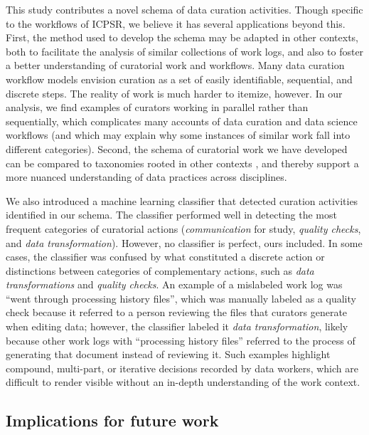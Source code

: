 \documentclass[conference]{IEEEtran}
\begin{document}
This study contributes a novel schema of data curation activities. Though specific to the workflows of ICPSR, we believe it has several applications beyond this. First, the method used to develop the schema may be adapted in other contexts, both to facilitate the analysis of similar collections of work logs, and also to foster a better understanding of curatorial work and workflows. Many data curation workflow models \cite{Higgins2008-ki, DDI-Lifecycle} envision curation as a set of easily identifiable, sequential, and discrete steps. The reality of work is much harder to itemize, however. In our analysis, we find examples of curators working in parallel rather than sequentially, which complicates many accounts of data curation and data science workflows (and which may explain why some instances of similar work fall into different categories). Second, the schema of curatorial work we have developed can be compared to taxonomies rooted in other contexts \cite{Chao2015-bq}, and thereby support a more nuanced understanding of data practices across disciplines.

We also introduced a machine learning classifier that detected curation activities identified in our schema. The classifier performed well in detecting the most frequent categories of curatorial actions (\textit{communication} for study, \textit{quality checks}, and \textit{data transformation}). However, no classifier is perfect, ours included. In some cases, the classifier was confused by what constituted a discrete action or distinctions between categories of complementary actions, such as \textit{data transformations} and \textit{quality checks}. An example of a mislabeled work log was “went through processing history files”, which was manually labeled as a quality check because it referred to a person reviewing the files that curators generate when editing data; however, the classifier labeled it \textit{data transformation}, likely because other work logs with “processing history files” referred to the process of generating that document instead of reviewing it. Such examples highlight compound, multi-part, or iterative decisions recorded by data workers, which are difficult to render visible without an in-depth understanding of the work context. 

\subsection{Implications for future work}
\label{future-work}
\end{document}
